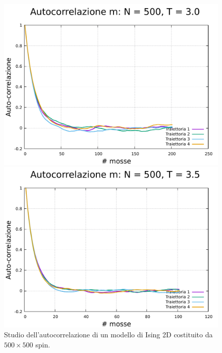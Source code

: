 \begin{figure}[htbp]
    \begin{minipage}{0.45\textwidth}  
      \centering
      \includegraphics[page=1, width=\textwidth]{Immagini/simIsing2D/metro/tcorr/auto_500_3.0.pdf}
      \caption{$T\,=\,3.0$}
    \end{minipage}\hfill
    \begin{minipage}{0.45\textwidth}  
      \centering
      \includegraphics[page=1, width=\textwidth]{Immagini/simIsing2D/metro/tcorr/auto_500_3.5.pdf}
      \caption{$T\,=\,3.5$}
    \end{minipage}
    \caption{Studio dell'autocorrelazione di un modello di Ising 2D costituito da $500 \times 500$ spin.}
\end{figure}

